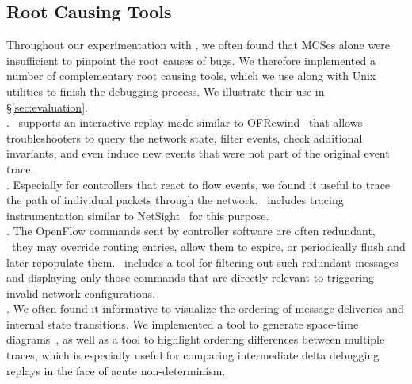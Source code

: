 
\subsection{Root Causing Tools}
\label{subsec:root_causing}

Throughout our experimentation with \projectname, we often found that
MCSes alone were insufficient to
pinpoint the root causes of bugs. We therefore implemented a number of
complementary root
causing tools,
which we use along with Unix utilities to finish the debugging
process. We illustrate their use in \S\ref{sec:evaluation}.\\[0.5ex]
%
. \projectname~supports an interactive replay mode
similar to OFRewind~\cite{ofrewind} that allows troubleshooters to query the
network state, filter events, check
additional invariants, and
even induce new events that were not part of the original event trace.\\[0.5ex]
%
. Especially for controllers that react to
flow events, we found it useful to trace the path of individual
packets through the network. \projectname~includes tracing instrumentation
similar to NetSight~\cite{ndb14} for this purpose.\\[0.5ex]
%
. The OpenFlow commands sent by controller software
are often redundant, \eg~they may override routing
entries, allow them to expire, or periodically flush
and later repopulate them. \projectname~includes a
tool for filtering out such redundant messages and
displaying only those commands that are directly relevant to triggering invalid network
configurations.\\[0.5ex]
%
. We often found it informative to visualize
the ordering of message deliveries and internal
state transitions. We implemented
a tool to generate space-time diagrams~\cite{Lamport:1978:TCO:359545.359563},
as well as a tool to highlight ordering differences
between multiple traces, which is especially useful for comparing
intermediate delta debugging replays in the face of acute non-determinism.


